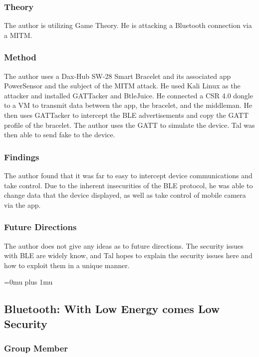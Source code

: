 \subsubsection{Theory}

\noindent
The author is utilizing Game Theory. He is attacking a Bluetooth connection via a MITM. 

\subsubsection{Method}

\noindent
The author uses a Dax-Hub SW-28 Smart Bracelet and its associated app PowerSensor and the subject of the MITM attack. He used Kali Linux as the attacker and installed GATTacker and BtleJuice. He connected a CSR 4.0 dongle to a VM to transmit data between the app, the bracelet, and the middleman. He then uses GATTacker to intercept the BLE advertisements and copy the GATT profile of the bracelet. The author uses the GATT to simulate the device. Tal was then able to send fake to the device. 

\subsubsection{Findings}

\noindent
The author found that it was far to easy to intercept device communications and take control. Due to the inherent insecurities of the BLE protocol, he was able to change data that the device displayed, as well as take control of mobile camera via the app. 

\subsubsection{Future Directions}

\noindent
The author does not give any ideas as to future directions. The security issues with BLE are widely know, and Tal hopes to explain the security issues here and how to exploit them in a unique manner. 

\Urlmuskip=0mu plus 1mu\relax

\noindent
\subsection{{B}luetooth: {W}ith {L}ow {E}nergy comes {L}ow {S}ecurity}

\subsubsection{Group Member}


